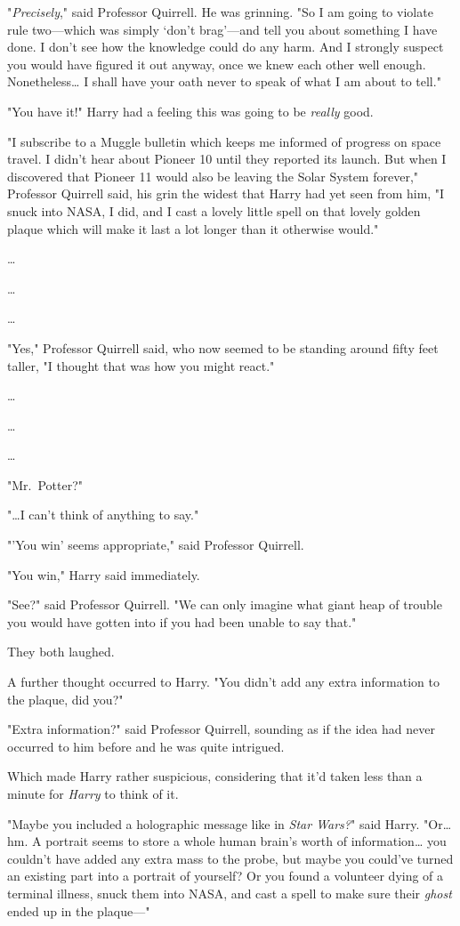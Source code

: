 "\emph{Precisely}," said Professor Quirrell. He was grinning. "So I am going to 
violate rule two---which was simply `don't brag'---and tell you about something 
I have done. I don't see how the knowledge could do any harm. And I strongly 
suspect you would have figured it out anyway, once we knew each other well 
enough. Nonetheless{\ldots} I shall have your oath never to speak of what I am 
about to tell."

"You have it!" Harry had a feeling this was going to be \emph{really} good.

"I subscribe to a Muggle bulletin which keeps me informed of progress on space 
travel. I didn't hear about Pioneer 10 until they reported its launch. But when 
I discovered that Pioneer 11 would also be leaving the Solar System forever," 
Professor Quirrell said, his grin the widest that Harry had yet seen from him, 
"I snuck into NASA, I did, and I cast a lovely little spell on that lovely 
golden plaque which will make it last a lot longer than it otherwise would."

{\ldots}

{\ldots}

{\ldots}

"Yes," Professor Quirrell said, who now seemed to be standing around fifty feet 
taller, "I thought that was how you might react."

{\ldots}

{\ldots}

{\ldots}

"Mr.~Potter?"

"{\ldots}I can't think of anything to say."

"'You win' seems appropriate," said Professor Quirrell.

"You win," Harry said immediately.

"See?" said Professor Quirrell. "We can only imagine what giant heap of trouble 
you would have gotten into if you had been unable to say that."

They both laughed.

A further thought occurred to Harry. "You didn't add any extra information to 
the plaque, did you?"

"Extra information?" said Professor Quirrell, sounding as if the idea had never 
occurred to him before and he was quite intrigued.

Which made Harry rather suspicious, considering that it'd taken less than a 
minute for \emph{Harry} to think of it.

"Maybe you included a holographic message like in \emph{Star Wars?}" said 
Harry. "Or{\ldots} hm. A portrait seems to store a whole human brain's worth of 
information{\ldots} you couldn't have added any extra mass to the probe, but 
maybe you could've turned an existing part into a portrait of yourself? Or you 
found a volunteer dying of a terminal illness, snuck them into NASA, and cast a 
spell to make sure their \emph{ghost} ended up in the plaque---"

